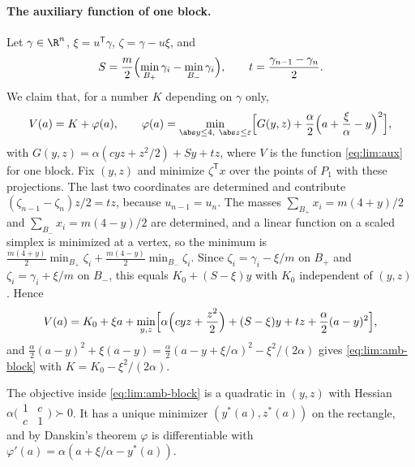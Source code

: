 \paragraph{The auxiliary function of one block.}
Let $\gamma\in\R^n$, $\xi=u^{\mathsf T}\gamma$, $\zeta=\gamma-u\xi$, and
\[
 S=\frac m2\Bigl(\min_{B_+}\gamma_i-\min_{B_-}\gamma_i\Bigr),\qquad
 t=\frac{\gamma_{n-1}-\gamma_n}2 .
\]
We claim that, for a number $K$ depending on $\gamma$ only,
\begin{equation}\label{eq:lim:amb-block}
 V(a)=K+\varphi(a),\qquad
 \varphi(a)=\min_{\abs y\le4,\ \abs z\le\varepsilon}
 \Bigl[G(y,z)+\frac\alpha2\Bigl(a+\frac\xi\alpha-y\Bigr)^2\Bigr],
\end{equation}
with $G(y,z)=\alpha(cyz+z^2/2)+Sy+tz$,
where $V$ is the function \eqref{eq:lim:aux} for one block. Fix $(y,z)$ and
minimize $\zeta^{\mathsf T}x$ over the points of $P_1$ with these
projections. The last two coordinates are determined and contribute
$(\zeta_{n-1}-\zeta_n)z/2=tz$, because $u_{n-1}=u_n$. The
masses $\sum_{B_+}x_i=m(4+y)/2$ and $\sum_{B_-}x_i=m(4-y)/2$ are determined,
and a linear function on a scaled simplex is minimized at a vertex, so the
minimum is $\frac{m(4+y)}2\min_{B_+}\zeta_i+\frac{m(4-y)}2
\min_{B_-}\zeta_i$. Since $\zeta_i=\gamma_i-\xi/m$ on $B_+$ and
$\zeta_i=\gamma_i+\xi/m$ on $B_-$, this equals $K_0+(S-\xi)y$ with
$K_0$ independent of $(y,z)$. Hence
\[
 V(a)=K_0+\xi a+\min_{y,z}\Bigl[\alpha\Bigl(cyz+\frac{z^2}2\Bigr)
 +(S-\xi)y+tz+\frac\alpha2(a-y)^2\Bigr],
\]
and $\frac\alpha2(a-y)^2+\xi(a-y)=\frac\alpha2(a-y+\xi/\alpha)^2-\xi^2/(2\alpha)$
gives \eqref{eq:lim:amb-block} with $K=K_0-\xi^2/(2\alpha)$.

The objective inside \eqref{eq:lim:amb-block} is a quadratic in $(y,z)$ with
Hessian $\alpha\bigl(\begin{smallmatrix}1&c\\c&1\end{smallmatrix}\bigr)\succ0$.
It has a unique minimizer $(y^*(a),z^*(a))$ on the rectangle, and by
Danskin's theorem $\varphi$ is differentiable with
$\varphi'(a)=\alpha(a+\xi/\alpha-y^*(a))$.

